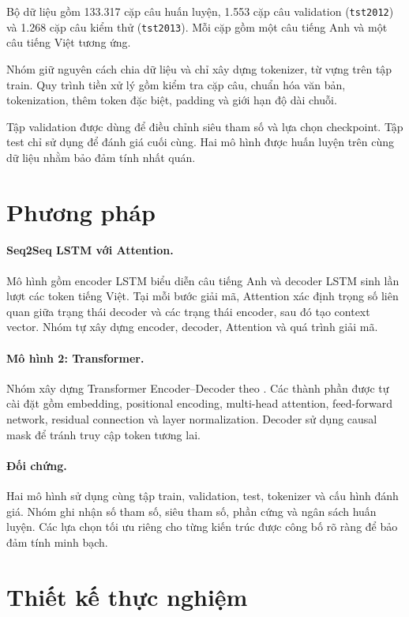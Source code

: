 \documentclass[11pt,a4paper]{article}
\begin{document}
Bộ dữ liệu gồm 133.317 cặp câu huấn luyện,
1.553 cặp câu validation (\texttt{tst2012})
và 1.268 cặp câu kiểm thử (\texttt{tst2013}).
Mỗi cặp gồm một câu tiếng Anh và một câu
tiếng Việt tương ứng.

Nhóm giữ nguyên cách chia dữ liệu và
chỉ xây dựng tokenizer, từ vựng trên
tập train. Quy trình tiền xử lý gồm
kiểm tra cặp câu, chuẩn hóa văn bản,
tokenization, thêm token đặc biệt,
padding và giới hạn độ dài chuỗi.

Tập validation được dùng để điều chỉnh
siêu tham số và lựa chọn checkpoint.
Tập test chỉ sử dụng để đánh giá cuối cùng.
Hai mô hình được huấn luyện trên cùng
dữ liệu nhằm bảo đảm tính nhất quán.

\section{Phương pháp}

\paragraph{Seq2Seq LSTM với Attention.}
Mô hình gồm encoder LSTM biểu diễn câu
tiếng Anh và decoder LSTM sinh lần lượt
các token tiếng Việt. Tại mỗi bước giải mã,
Attention xác định trọng số liên quan
giữa trạng thái decoder và các trạng thái
encoder, sau đó tạo context vector.
Nhóm tự xây dựng encoder, decoder,
Attention và quá trình giải mã.

\paragraph{Mô hình 2: Transformer.}
Nhóm xây dựng Transformer Encoder--Decoder
theo \citet{vaswani2017attention}.
Các thành phần được tự cài đặt gồm
embedding, positional encoding,
multi-head attention, feed-forward network,
residual connection và layer normalization.
Decoder sử dụng causal mask để tránh
truy cập token tương lai.

\paragraph{Đối chứng.}
Hai mô hình sử dụng cùng tập train,
validation, test, tokenizer và cấu hình
đánh giá. Nhóm ghi nhận số tham số,
siêu tham số, phần cứng và ngân sách
huấn luyện. Các lựa chọn tối ưu riêng
cho từng kiến trúc được công bố rõ ràng
để bảo đảm tính minh bạch.

\section{Thiết kế thực nghiệm}
\end{document}
